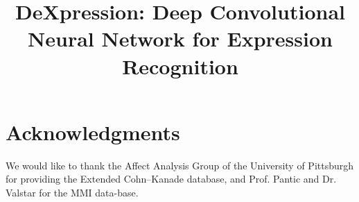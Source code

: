 \documentclass[10pt,journal,compsoc, hidelinks]{IEEEtran}
\begin{document}


\title{DeXpression: Deep Convolutional Neural Network for Expression Recognition}



\maketitle


















\section*{Acknowledgments}

We would like to thank the Affect Analysis Group of the University of Pittsburgh for providing the Extended Cohn–Kanade database, and Prof. Pantic and Dr. Valstar for the MMI data-base.





\end{document}
